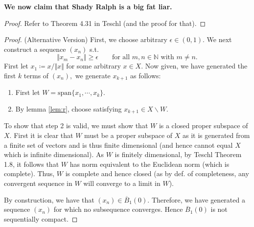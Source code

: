 \documentclass[10pt]{article}
\begin{document}

    

\noindent
\textbf{We now claim that Shady Ralph is a big fat liar.}

\begin{proof}
    Refer to Theorem 4.31 in Teschl (and the proof for that).
\end{proof}

\begin{proof}
    (Alternative Version) First, we choose arbitrary $\epsilon\in(0,1).$ We next construct a sequence $(x_n)$ s.t.
    \[\Vert x_m-x_n \Vert\ge \epsilon \qquad\text{for all $m,n\in\mathbb{N}$ with $m\neq n.$}\]    
    First let $x_1 \coloneqq x/\Vert x\Vert$ for some arbitrary $x \in X.$ Now given, we have generated the first $k$  terms of $(x_n),$ we generate $x_{k+1}$ as follows:
    \begin{enumerate}
        \item First let $W = \text{span}\{x_1,\cdots, x_k\}.$
        \item By lemma \ref{lem:r}, choose satisfying $x_{k+1}\in X\backslash W.$
    \end{enumerate}
    To show that step 2 is valid, we must show that $W$ is a closed proper subspace of $X$. First it is clear that $W$ must be a proper subspace of $X$ as it is generated from a finite set of vectors and is thus finite dimensional (and hence cannot equal $X$ which is infinite dimensional). As $W$ is finitely dimensional, by Teschl Theorem 1.8, it follows that $W$ has norm equivalent to the Euclidean norm (which is complete). Thus, $W$ is complete and hence closed (as by def. of completeness, any convergent sequence in $W$ will converge to a limit in $W$).

    By construction, we have that $(x_n)\in\overline{B}_1(0).$ Therefore, we have generated a sequence $(x_n)$ for which no subsequence converges. Hence $\overline{B}_1(0)$ is not sequentially compact.
\end{proof}
\end{document}
